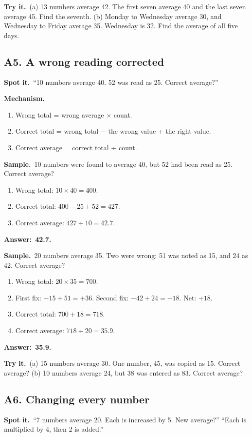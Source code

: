 \documentclass[11pt,a4paper]{article}
\let\oldsubsection\subsection
\renewcommand{\subsection}{\needspace{9\baselineskip}\oldsubsection}
\newcommand{\spot}{\textbf{\color{ember}Spot it.}\ }
\newcommand{\mech}{\textbf{\color{ember}Mechanism.}\ }
\newif\ifkeepsamp
\newcommand{\ans}[1]{\par\nopagebreak\noindent\textbf{\color{ember}Answer:}\ \textbf{#1}\par}
\newcommand{\samp}{\ifkeepsamp\needspace{4\baselineskip}\fi\textbf{\color{ember}Sample.}\ }
\newcommand{\tryit}[1]{\textbf{\color{ember}Try it.}\ #1}
\begin{document}
\tryit (a) 13 numbers average 42. The first seven average 40 and the last seven average 45. Find the seventh. (b) Monday to Wednesday average 30, and Wednesday to Friday average 35. Wednesday is 32. Find the average of all five days.

\subsection{A5. A wrong reading corrected}
\spot ``10 numbers average 40. 52 was read as 25. Correct average?''

\mech
\begin{enumerate}
\item Wrong total = wrong average $\times$ count.
\item Correct total = wrong total $-$ the wrong value + the right value.
\item Correct average = correct total $\div$ count.
\end{enumerate}

\samp 10 numbers were found to average 40, but 52 had been read as 25. Correct average?
\begin{enumerate}
\item Wrong total: $10 \times 40 = 400$.
\item Correct total: $400 - 25 + 52 = 427$.
\item Correct average: $427 \div 10 = 42.7$.
\end{enumerate}
\ans{42.7.}

\samp 20 numbers average 35. Two were wrong: 51 was noted as 15, and 24 as 42. Correct average?
\begin{enumerate}
\item Wrong total: $20 \times 35 = 700$.
\item First fix: $-15 + 51 = +36$. Second fix: $-42 + 24 = -18$. Net: $+18$.
\item Correct total: $700 + 18 = 718$.
\item Correct average: $718 \div 20 = 35.9$.
\end{enumerate}
\ans{35.9.}

\tryit (a) 15 numbers average 30. One number, 45, was copied as 15. Correct average? (b) 10 numbers average 24, but 38 was entered as 83. Correct average?

\subsection{A6. Changing every number}
\spot ``7 numbers average 20. Each is increased by 5. New average?'' ``Each is multiplied by 4, then 2 is added.''
\end{document}
